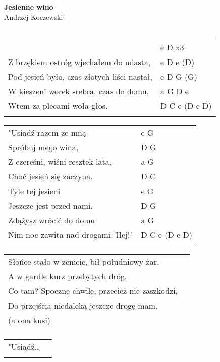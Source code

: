 \documentclass[a5paper]{article}
\begin{document}


\noindent
\fontsize{12pt}{15pt}\selectfont
\textbf{Jesienne wino} \\
\fontsize{8pt}{10pt}\selectfont
Andrzej Koczewski \\ \\
\fontsize{10pt}{12pt}\selectfont
{}
\begin{tabular}{@{}p{8.00cm}p{3cm}@{}}
\noindent
& e D x3 \\
Z brzękiem ostróg wjechałem do miasta, & e D e (D) \\
Pod jesień było, czas złotych liści nastał, & e D G (G) \\
W kieszeni worek srebra, czas do domu, & a G D e \\
Wtem za plecami woła głos. & D C e (D e D) \\ \\
\end{tabular}

\noindent
\begin{tabular}{@{}p{7.00cm}p{3cm}@{}}
"Usiądź razem ze mną & e G \\
Spróbuj mego wina, & D G \\
Z czereśni, wiśni resztek lata, & a G \\
Choć jesień się zaczyna. & D C \\
Tyle tej jesieni & e G \\
Jeszcze jest przed nami, & D G \\
Zdążysz wrócić do domu & a G \\
Nim noc zawita nad drogami. Hej!" & D C e (D e D) \\ \\
\end{tabular}

\noindent
\begin{tabular}{@{}p{8.00cm}p{3cm}@{}}
Słońce stało w zenicie, bił południowy żar, \\
A w gardle kurz przebytych dróg. \\
Co tam? Spocznę chwilę, przecież nie zaszkodzi, \\
Do przejścia niedaleką jeszcze drogę mam. \\
(a ona kusi) \\ \\
\end{tabular}

\noindent
\begin{tabular}{@{}p{8.00cm}p{3cm}@{}}
"Usiądź… \\ \\
\end{tabular}
\end{document}
